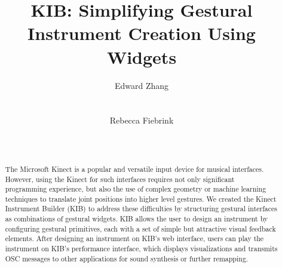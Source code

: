 \documentclass{nime-alternate}
\begin{document}
%

\title{KIB: Simplifying Gestural Instrument Creation Using Widgets}

%
%
%
%
%

\author{
\alignauthor Edward Zhang\\
    \\
    \\
\alignauthor Rebecca Fiebrink\\
    \\
    \\
}

\maketitle
\begin{abstract}
The Microsoft Kinect is a popular and versatile input device for musical interfaces.
However, using the Kinect for such interfaces requires not only significant programming
experience, but also the use of complex geometry or machine learning techniques to translate joint
positions into higher level gestures. We created the Kinect Instrument Builder (KIB) to
address these difficulties by structuring gestural interfaces as combinations of gestural
widgets. KIB allows the user to design an instrument by configuring gestural primitives,
each with a set of simple but attractive visual feedback elements. After designing an instrument
on KIB's web interface, users can play the instrument on KIB's performance interface, 
which displays visualizations and transmits OSC messages to other applications for sound synthesis
or further remapping.
\end{abstract}
\end{document}
